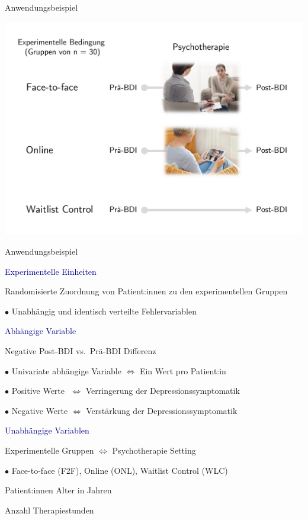 \documentclass[
  8pt,
  ignorenonframetext,
]{beamer}
\begin{document}
\begin{frame}{Anwendungsbeispiel}
\protect\hypertarget{anwendungsbeispiel}{}
\begin{center}\includegraphics[width=1\linewidth]{8_Abbildungen/alm_8_modellstudie} \end{center}
\end{frame}

\begin{frame}{Anwendungsbeispiel}
\protect\hypertarget{anwendungsbeispiel-1}{}
\normalsize

\textcolor{darkblue}{Experimentelle Einheiten}

\small

Randomisierte Zuordnung von Patient:innen zu den experimentellen Gruppen

\(\bullet\) Unabhängig und identisch verteilte Fehlervariablen

\normalsize

\textcolor{darkblue}{Abhängige Variable}

\small

Negative Post-BDI vs.~Prä-BDI Differenz

\(\bullet\) Univariate abhängige Variable \(\Leftrightarrow\) Ein Wert
pro Patient:in

\(\bullet\) Positive Werte \(\,\,\Leftrightarrow\) Verringerung der
Depressionssymptomatik

\(\bullet\) Negative Werte \(\Leftrightarrow\) Verstärkung der
Depressionssymptomatik

\normalsize

\textcolor{darkblue}{Unabhängige Variablen}

\small

Experimentelle Gruppen \(\Leftrightarrow\) Psychotherapie Setting

\(\bullet\) Face-to-face (F2F), Online (ONL), Waitlist Control (WLC)

Patient:innen Alter in Jahren

Anzahl Therapiestunden
\end{frame}
\end{document}
